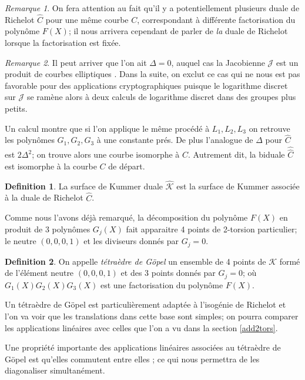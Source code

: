 \documentclass[a4paper]{article}
\theoremstyle{definition}
\newtheorem{definition}{Definition}[section]
\theoremstyle{remark}
\newtheorem{remarque}{Remarque}
\numberwithin{equation}{section}
\begin{document}
\begin{remarque}
On fera attention au fait qu'il y a potentiellement plusieurs duale de Richelot $\hat{C}$ pour une même courbe $C$, correspondant à différente factorisation du polynôme $F(X)$; il nous arrivera cependant de parler de \emph{la} duale de Richelot lorsque la factorisation est fixée.
\end{remarque}

\begin{remarque}
Il peut arriver que l'on ait $\Delta = 0$, auquel cas la Jacobienne $\mathcal{J}$ est un produit de courbes elliptiques \citep{cassels-Flynn}. Dans la suite, on exclut ce cas qui ne nous est pas favorable pour des applications cryptographiques puisque le logarithme discret sur $\mathcal{J}$ se ramène alors à deux calculs de logarithme discret dans des groupes plus petits.
\end{remarque}

Un calcul montre que si l'on applique le même procédé à $L_1,L_2,L_3$ on retrouve les polynômes $G_1,G_2,G_3$ à une constante prés. De plus l'analogue de $\Delta$ pour $\hat{C}$ est $2\Delta^2$; on trouve alors une courbe isomorphe à $C$. Autrement dit, la biduale $\hat{\hat{C}}$ est isomorphe à la courbe $C$ de départ.

\begin{definition}
La surface de Kummer duale $\hat{\mathcal{K}}$ est la surface de Kummer associée à la duale de Richelot $\hat{C}$.
\end{definition}

Comme nous l'avons déjà remarqué, la décomposition du polynôme $F(X)$ en produit de 3 polynômes $G_j(X)$ fait apparaitre 4 points de 2-torsion particulier; le neutre $(0,0,0,1)$ et les diviseurs donnés par $G_j=0$.

\begin{definition}
On appelle \emph{tétraèdre de G\"opel} un ensemble de 4 points de $\mathcal{K}$ formé de l'élément neutre $(0,0,0,1)$ et des 3 points donnés par $G_j=0$; où $G_1(X)G_2(X)G_3(X)$ est une factorisation du polynôme $F(X)$.
\end{definition}

Un tétraèdre de G\"opel est particulièrement adaptée à l'isogénie de Richelot et l'on va voir que les translations dans cette base sont simples; on pourra comparer les applications linéaires avec celles que l'on a vu dans la section \ref{add2tors}.

Une propriété importante des applications linéaires associées au tétraèdre de G\"opel est qu'elles commutent entre elles \citep{cassels-Flynn}; ce qui nous permettra de les diagonaliser simultanément. 
\end{document}

